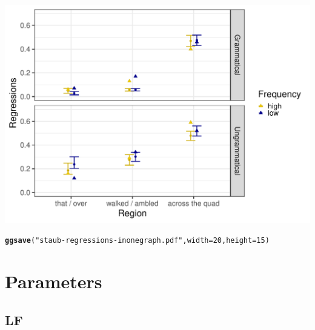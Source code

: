 \documentclass{article}\usepackage[]{graphicx}\usepackage[]{color}
\makeatletter
\def\maxwidth{ %
  \ifdim\Gin@nat@width>\linewidth
    \linewidth
  \else
    \Gin@nat@width
  \fi
}
\newcommand{\hlnum}[1]{\textcolor[rgb]{0.686,0.059,0.569}{#1}}%
\newcommand{\hlstr}[1]{\textcolor[rgb]{0.192,0.494,0.8}{#1}}%
\newcommand{\hlstd}[1]{\textcolor[rgb]{0.345,0.345,0.345}{#1}}%
\newcommand{\hlkwc}[1]{\textcolor[rgb]{0.333,0.667,0.333}{#1}}%
\newcommand{\hlkwd}[1]{\textcolor[rgb]{0.737,0.353,0.396}{\textbf{#1}}}%
\newenvironment{kframe}{%
 \def\at@end@of@kframe{}%
 \ifinner\ifhmode%
  \def\at@end@of@kframe{\end{minipage}}%
  \begin{minipage}{\columnwidth}%
 \fi\fi%
 \def\FrameCommand##1{\hskip\@totalleftmargin \hskip-\fboxsep
 \colorbox{shadecolor}{##1}\hskip-\fboxsep
     \hskip-\linewidth \hskip-\@totalleftmargin \hskip\columnwidth}%
 \MakeFramed {\advance\hsize-\width
   \@totalleftmargin\z@ \linewidth\hsize
   \@setminipage}}%
 {\par\unskip\endMakeFramed%
 \at@end@of@kframe}
\newenvironment{knitrout}{}{} %
\makeatother
\begin{document}
\begin{knitrout}
\color{fgcolor}
\includegraphics[width=\maxwidth]{figures/figure_staub_exp3unnamed-chunk-14-1} 

\end{knitrout}
\begin{knitrout}
\color{fgcolor}\begin{kframe}
\begin{alltt}
\hlkwd{ggsave}\hlstd{(}\hlstr{"staub-regressions-inonegraph.pdf"}\hlstd{,} \hlkwc{width} \hlstd{=} \hlnum{20}\hlstd{,} \hlkwc{height} \hlstd{=} \hlnum{15}\hlstd{)}
\end{alltt}
\end{kframe}
\end{knitrout}


\section{Parameters}



\subsection{LF}
\end{document}
